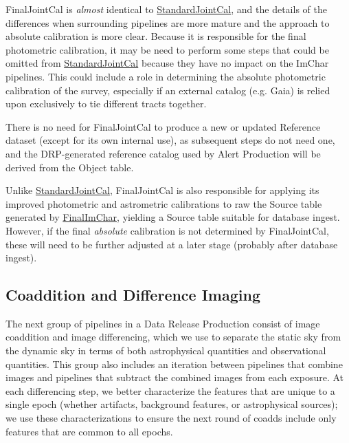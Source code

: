 FinalJointCal is \emph{almost} identical to \hyperref[sec:drpStandardJointCal]{StandardJointCal}, and the details of the differences when surrounding pipelines are more mature and the approach to absolute calibration is more clear.  Because it is responsible for the final photometric calibration, it may be need to perform some steps that could be omitted from \hyperref[sec:drpStandardJointCal]{StandardJointCal} because they have no impact on the ImChar pipelines.  This could include a role in determining the absolute photometric calibration of the survey, especially if an external catalog (e.g. Gaia) is relied upon exclusively to tie different tracts together.

There is no need for FinalJointCal to produce a new or updated Reference dataset (except for its own internal use), as subsequent steps do not need one, and the DRP-generated reference catalog used by Alert Production will be derived from the Object table.

Unlike \hyperref[sec:drpStandardJointCal]{StandardJointCal}, FinalJointCal is also responsible for applying its improved photometric and astrometric calibrations to raw the Source table generated by \hyperref[sec:drpFinalImChar]{FinalImChar}, yielding a Source table suitable for database ingest.  However, if the final \emph{absolute} calibration is not determined by FinalJointCal, these will need to be further adjusted at a later stage (probably after database ingest).

\subsection{Coaddition and Difference Imaging}
\label{sec:drp_coaddition_and_diffim}

The next group of pipelines in a Data Release Production consist of image coaddition and image differencing, which we use to separate the static sky from the dynamic sky in terms of both astrophysical quantities and observational quantities.  This group also includes an iteration between pipelines that combine images and pipelines that subtract the combined images from each exposure.  At each differencing step, we better characterize the features that are unique to a single epoch (whether artifacts, background features, or astrophysical sources); we use these characterizations to ensure the next round of coadds include only features that are common to all epochs.

